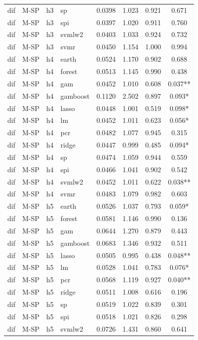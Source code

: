 \begin{ThreePartTable}
\begin{longtable}[t]{llclcccc}
dif & M-SP & h3 & sp & 0.0398 & 1.023 & 0.921 & 0.671\\
dif & M-SP & h3 & spi & 0.0397 & 1.020 & 0.911 & 0.760\\
dif & M-SP & h3 & svmlw2 & 0.0403 & 1.033 & 0.924 & 0.732\\
dif & M-SP & h3 & svmr & 0.0450 & 1.154 & 1.000 & 0.994\\
\addlinespace
dif & M-SP & h4 & earth & 0.0524 & 1.170 & 0.902 & 0.688\\
dif & M-SP & h4 & forest & 0.0513 & 1.145 & 0.990 & 0.438\\
dif & M-SP & h4 & gam & 0.0452 & 1.010 & 0.608 & 0.037**\\
dif & M-SP & h4 & gamboost & 0.1120 & 2.502 & 0.897 & 0.093*\\
dif & M-SP & h4 & lasso & 0.0448 & 1.001 & 0.519 & 0.098*\\
dif & M-SP & h4 & lm & 0.0452 & 1.011 & 0.623 & 0.056*\\
dif & M-SP & h4 & pcr & 0.0482 & 1.077 & 0.945 & 0.315\\
dif & M-SP & h4 & ridge & 0.0447 & 0.999 & 0.485 & 0.094*\\
dif & M-SP & h4 & sp & 0.0474 & 1.059 & 0.944 & 0.559\\
dif & M-SP & h4 & spi & 0.0466 & 1.041 & 0.902 & 0.542\\
dif & M-SP & h4 & svmlw2 & 0.0452 & 1.011 & 0.622 & 0.038**\\
dif & M-SP & h4 & svmr & 0.0483 & 1.079 & 0.982 & 0.603\\
\addlinespace
dif & M-SP & h5 & earth & 0.0526 & 1.037 & 0.793 & 0.059*\\
dif & M-SP & h5 & forest & 0.0581 & 1.146 & 0.990 & 0.136\\
dif & M-SP & h5 & gam & 0.0644 & 1.270 & 0.879 & 0.443\\
dif & M-SP & h5 & gamboost & 0.0683 & 1.346 & 0.932 & 0.511\\
dif & M-SP & h5 & lasso & 0.0505 & 0.995 & 0.438 & 0.048**\\
dif & M-SP & h5 & lm & 0.0528 & 1.041 & 0.783 & 0.076*\\
dif & M-SP & h5 & pcr & 0.0568 & 1.119 & 0.927 & 0.040**\\
dif & M-SP & h5 & ridge & 0.0511 & 1.008 & 0.616 & 0.196\\
dif & M-SP & h5 & sp & 0.0519 & 1.022 & 0.839 & 0.301\\
dif & M-SP & h5 & spi & 0.0518 & 1.021 & 0.826 & 0.298\\
dif & M-SP & h5 & svmlw2 & 0.0726 & 1.431 & 0.860 & 0.641\\

\end{longtable}
\end{ThreePartTable}
